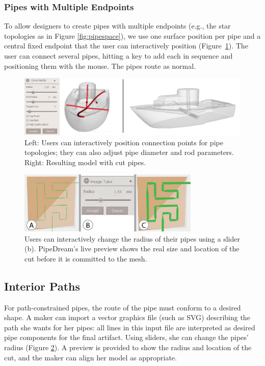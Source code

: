\subsubsection{Pipes with Multiple Endpoints}
To allow designers to create pipes with multiple endpoints (e.g., the star topologies as in Figure \ref{fig:pipespace}), we use one surface position per pipe and a central fixed endpoint that the user can interactively position (Figure~\ref{fig:boat-star}).  The user can connect several pipes, hitting a key to add each in sequence and positioning them with the mouse.  The pipes route as normal.

\begin{figure}[b]
\centering
    \includegraphics[width=1.0\columnwidth]{figures/boat-star.png}
\caption{Left: Users can interactively position connection points for pipe topologies; they can also adjust pipe diameter and rod parameters. Right: Resulting model with cut pipes.}
\label{fig:boat-star}
\end{figure}

\begin{figure}
\centering
    \includegraphics[width=3.4in]{figures/radius.png}
\caption{Users can interactively change the radius of their pipes using a slider (b).  PipeDream's live preview shows the real size and location of the cut before it is committed to the mesh.}
\label{fig:radius}
\end{figure}

\subsection{Interior Paths}

For path-constrained pipes, the route of the pipe must conform to a desired shape. A maker can import a vector graphics file (such as SVG) describing the path she wants for her pipes: all lines in this input file are interpreted as desired pipe components for the final artifact.  Using sliders, she can change the pipes' radius (Figure \ref{fig:radius}).  A preview is provided to show the radius and location of the cut, and the maker can align her model as appropriate.


